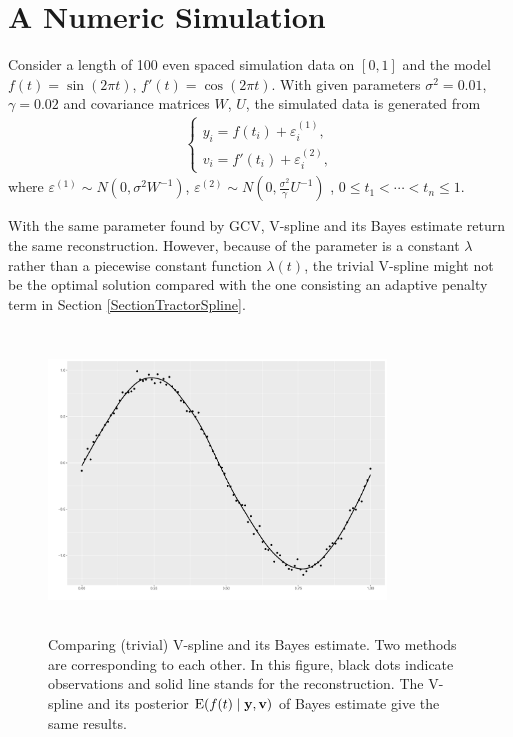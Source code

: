 \section{A Numeric Simulation}

Consider a length of 100 even spaced simulation data on $[0,1]$ and the model $f(t)=\sin(2\pi t)$, $f'(t)=\cos(2\pi t)$. With given parameters $\sigma^2=0.01$, $\gamma=0.02$ and covariance matrices $W$, $U$, the simulated data  is generated from  
\begin{align}
\begin{cases}
y_i =f(t_i)+\varepsilon_{i}^{(1)}, \\
v_i =f'(t_i)+\varepsilon_{i}^{(2)}, 
\end{cases}
\end{align}
where $\varepsilon^{(1)}\sim N\left(0,\sigma^2W^{-1}\right)$, $\varepsilon^{(2)}\sim N\left(0,\frac{\sigma^2}{\gamma}U^{-1}\right)$ , $0\leq t_1 < \cdots < t_n \leq 1$. 

With the same parameter found by GCV, V-spline and its Bayes estimate return the same reconstruction. However, because of the parameter is a constant $\lambda$ rather than a piecewise constant function $\lambda(t)$, the trivial V-spline might not be the optimal solution compared with the one consisting an adaptive penalty term in Section \ref{SectionTractorSpline}. 

\begin{figure}[h]
\centering
\includegraphics[width=0.8\textwidth,height=8cm]{Chapters/03GPR/plot/ggsim_cov} 
 \caption{Comparing (trivial) V-spline and its Bayes estimate. Two methods are corresponding to each other. In this figure, black dots indicate observations and solid line stands for the reconstruction. The V-spline and its posterior $\mathrm{E}(f(t) \mid \mathbf{y}, \mathbf{v})$ of Bayes estimate give the same results. }
\end{figure}



